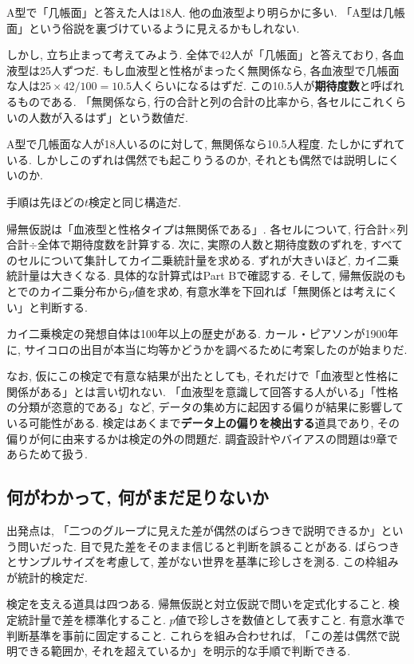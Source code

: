     A型で「几帳面」と答えた人は18人.
    他の血液型より明らかに多い.
    「A型は几帳面」という俗説を裏づけているように見えるかもしれない.

    しかし, 立ち止まって考えてみよう.
    全体で42人が「几帳面」と答えており, 各血液型は25人ずつだ.
    もし血液型と性格がまったく無関係なら, 各血液型で几帳面な人は$25 \times 42/100 = 10.5$人くらいになるはずだ.
    この10.5人が\textbf{期待度数}と呼ばれるものである.
    「無関係なら, 行の合計と列の合計の比率から, 各セルにこれくらいの人数が入るはず」という数値だ.

    A型で几帳面な人が18人いるのに対して, 無関係なら10.5人程度.
    たしかにずれている.
    しかしこのずれは偶然でも起こりうるのか, それとも偶然では説明しにくいのか.

    手順は先ほどの$t$検定と同じ構造だ.

    帰無仮説は「血液型と性格タイプは無関係である」.
    各セルについて, 行合計$\times$列合計$\div$全体で期待度数を計算する.
    次に, 実際の人数と期待度数のずれを, すべてのセルについて集計してカイ二乗統計量を求める.
    ずれが大きいほど, カイ二乗統計量は大きくなる.
    具体的な計算式はPart Bで確認する.
    そして, 帰無仮説のもとでのカイ二乗分布から$p$値を求め, 有意水準を下回れば「無関係とは考えにくい」と判断する.

    カイ二乗検定の発想自体は100年以上の歴史がある.
    カール・ピアソンが1900年に, サイコロの出目が本当に均等かどうかを調べるために考案したのが始まりだ.

    なお, 仮にこの検定で有意な結果が出たとしても, それだけで「血液型と性格に関係がある」とは言い切れない.
    「血液型を意識して回答する人がいる」「性格の分類が恣意的である」など, データの集め方に起因する偏りが結果に影響している可能性がある.
    検定はあくまで\textbf{データ上の偏りを検出する}道具であり, その偏りが何に由来するかは検定の外の問題だ.
    調査設計やバイアスの問題は9章であらためて扱う.


  \subsection{何がわかって, 何がまだ足りないか}

    出発点は, 「二つのグループに見えた差が偶然のばらつきで説明できるか」という問いだった.
    目で見た差をそのまま信じると判断を誤ることがある.
    ばらつきとサンプルサイズを考慮して, 差がない世界を基準に珍しさを測る.
    この枠組みが統計的検定だ.

    検定を支える道具は四つある.
    帰無仮説と対立仮説で問いを定式化すること.
    検定統計量で差を標準化すること.
    $p$値で珍しさを数値として表すこと.
    有意水準で判断基準を事前に固定すること.
    これらを組み合わせれば, 「この差は偶然で説明できる範囲か, それを超えているか」を明示的な手順で判断できる.

